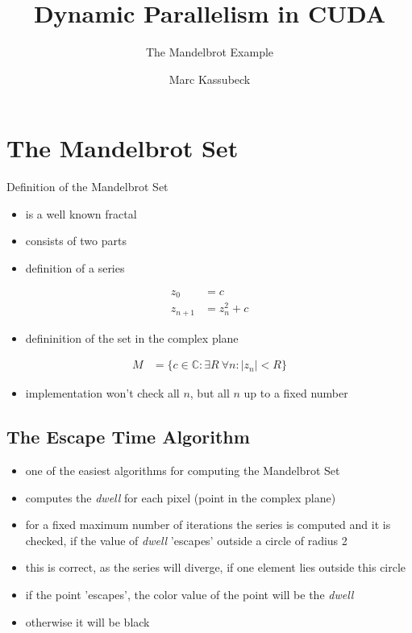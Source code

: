 \documentclass[fleqn,11pt,aspectratio=43]{beamer}
\title{Dynamic Parallelism in CUDA}
\subtitle{The Mandelbrot Example}
\author{Marc Kassubeck}
\begin{document}

\begin{frame}[plain]
\titlepage
\end{frame}

\begin{frame}[plain]
  \tableofcontents
\end{frame}


\section{The Mandelbrot Set}

\begin{frame}{Definition of the Mandelbrot Set}
	\begin{itemize}
		\item is a well known fractal
		\item consists of two parts
		\item definition of a series
	\end{itemize}	
	\begin{align*}
		z_0 &= c\\
		z_{n+1} &= z_n^2 + c
	\end{align*}
	\begin{itemize}
		\item defininition of the set in the complex plane
	\end{itemize}
	\begin{align*}
		M &= \{c \in \mathbb{C}: \exists R\ \forall n: \left| z_n \right| < R \}
	\end{align*}
	\begin{itemize}
		\item implementation won't check all $n$, but all $n$ up to a fixed number
	\end{itemize}
\end{frame}

\subsection{The Escape Time Algorithm}

\begin{frame}
	\begin{itemize}
		\item one of the easiest algorithms for computing the Mandelbrot Set
		\item computes the \textit{dwell} for each pixel (point in the complex plane)
		\item for a fixed maximum number of iterations the series is computed and it is checked, if the value of \textit{dwell} 'escapes' outside a circle of radius 2
		\item this is correct, as the series will diverge, if one element lies outside this circle
		\item if the point 'escapes', the color value of the point will be the \textit{dwell}
		\item otherwise it will be black
	\end{itemize}
\end{frame}
\end{document}
